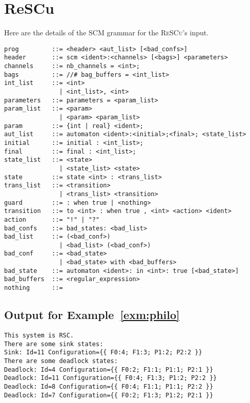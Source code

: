 \begin{appendices}\label{apx}
  
\section*{ReSCu}\label{apx:rescu}

Here are the details of the SCM grammar for the \textsc{ReSCu}'s input.

\begin{lstlisting}[language={},caption={Simplified SCM grammar},
    keywordstyle=\color{blue}\bfseries,label={lst:scm-grammar}] 
prog         ::= <header> <aut_list> [<bad_confs>]
header       ::= scm <ident>:<channels> [<bags>] <parameters>
channels     ::= nb_channels = <int>;
bags         ::= //# bag_buffers = <int_list>
int_list     ::= <int>
               | <int_list>, <int>
parameters   ::= parameters = <param_list>
param_list   ::= <param>
               | <param> <param_list>
param        ::= {int | real} <ident>;
aut_list     ::= automaton <ident>:<initial>;<final>; <state_list>
initial      ::= initial : <int_list>;
final        ::= final : <int_list>;
state_list   ::= <state>
               | <state_list> <state>
state        ::= state <int> : <trans_list>
trans_list   ::= <transition>
               | <trans_list> <transition>
guard        ::= : when true | <nothing>
transition   ::= to <int> : when true , <int> <action> <ident>
action       ::= "!" | "?"
bad_confs    ::= bad_states: <bad_list>
bad_list     ::= (<bad_conf>)
               | <bad_list> (<bad_conf>)
bad_conf     ::= <bad_state>
               | <bad_state> with <bad_buffers>
bad_state    ::= automaton <ident>: in <int>: true [<bad_state>]
bad_buffers  ::= <regular_expression>
nothing      ::= 
\end{lstlisting}

\newpage

\subsection*{Output for Example~\ref{exm:philo}}

\begin{lstlisting}[language={},caption={Output of Example~\ref{exm:philo}},
    label={lst:philo}]
This system is RSC.
There are some sink states:
Sink: Id=11 Configuration={{ F0:4; F1:3; P1:2; P2:2 }}
There are some deadlock states:
Deadlock: Id=4 Configuration={{ F0:2; F1:1; P1:1; P2:1 }}
Deadlock: Id=11 Configuration={{ F0:4; F1:3; P1:2; P2:2 }}
Deadlock: Id=8 Configuration={{ F0:4; F1:1; P1:1; P2:2 }}
Deadlock: Id=7 Configuration={{ F0:2; F1:3; P1:2; P2:1 }}
\end{lstlisting}


\end{appendices}
